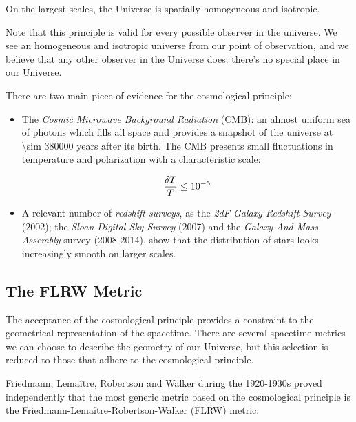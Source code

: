 \begin{principle}
        On the largest scales, the Universe is spatially homogeneous and isotropic.
\end{principle}

Note that this principle is valid for every possible observer in the
universe. We see an homogeneous and isotropic universe from our point of
observation, and we believe that any other observer in the Universe does:
there's no special place in our Universe.

There are two main piece of evidence for the cosmological principle:

\begin{itemize}
        \item The \emph{Cosmic Microwave Background Radiation} (CMB): an almost
        uniform sea of photons which fills all space and provides a snapshot of the
        universe at \num{\sim 380000} years after its birth. The CMB
        presents small fluctuations in temperature and polarization with a
        characteristic scale:

        \begin{equation}
                \frac{\var{T}}{T} \leq \num{e-5}
        \end{equation}

        \item A relevant number of \emph{redshift surveys}, as the
        \emph{2dF Galaxy Redshift Survey} (2002); the \emph{Sloan Digital
        Sky Survey} (2007) and the \emph{Galaxy And Mass Assembly} survey
        (2008-2014), show that the distribution of stars looks increasingly
        smooth on larger scales.
\end{itemize}

\subsection{The FLRW Metric}\label{ss:flrw}

The acceptance of the cosmological principle provides a constraint to the
geometrical representation of the spacetime. There are several spacetime
metrics we can choose to describe the geometry of our Universe, but this
selection is reduced to those that adhere to the cosmological principle.

Friedmann, Lema\^itre, Robertson and Walker during the 1920-1930s proved
independently that the most generic metric based on the cosmological
principle is the Friedmann-Lema\^itre-Robertson-Walker (FLRW) metric:

